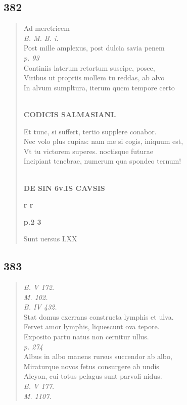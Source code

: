 \documentclass[11pt, a4paper]{report}
\begin{document}
            \subsection*{382}
      \begin{verse}
       \lbrack Ad meretricem \rbrack  \\ \textit{B. M. B. i.} \\ Post mille amplexus, post dulcia savia penem \\ \textit{p. 93} \\ Continiis laterum retortum suscipe, posce, \\ Viribus ut propriis mollem tu reddas, ab alvo \\ In alvum sumpltura, iterum qucm tempore certo \\ 
        ﻿\pagebreak 
    \begin{center} \textbf{CODICIS SALMASIANI.} \end{center} \marginpar{[293]} Et tunc, si suffert, tertio supplere conabor. \\ Nec volo plus cupias: nam me si cogis, iniquum est, \\ Vt tu victorem superes. noctisque futurae \\ Incipiant tenebrae, numerum qua spondeo ternum! \\ 
        ﻿\pagebreak 
    \begin{center} \textbf{DE SIN 6v.IS CAVSIS} \end{center}\begin{center} \textbf{r r} \end{center} \marginpar{[7]}  \marginpar{[I]} \begin{center} \textbf{p.2 3} \end{center}Sunt uersus LXX \\ 
      \end{verse}
  
            \subsection*{383}
      \begin{verse}
      \textit{B. V 172.} \\ \textit{M. 102.} \\ \textit{B. IV 432.} \\ Stat domus exerrans constructa lymphis et ulva. \\ Fervet amor lymphis, liquescunt ova tepore. \\ Exposito partu natus non cernitur ullus. \\ \textit{p. 274} \\ Albus in albo manens rursus succendor ab albo, \\ Miraturque novos fetus consurgere ab undis \\ Alcyon, cui totus pelagus sunt parvoli nidus. \\ \textit{B. V 177.} \\ \textit{M. 1107.} \\ 
      \end{verse}
  
\end{document}
